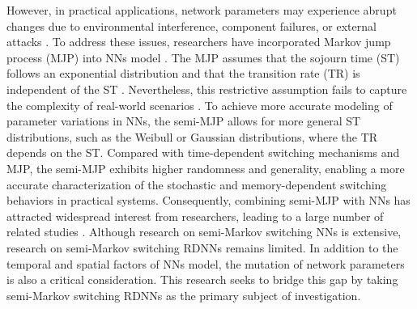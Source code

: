 \documentclass[preprint,review,fleqn,sort&compress,3p]{elsarticle}
\theoremstyle{definition}%
\begin{document}
	However, in practical applications, network parameters may experience abrupt changes due to environmental interference, component failures, or external attacks \cite{qi2025protocolbaseda}. To address these issues, researchers have incorporated Markov jump process (MJP) into NNs model . The MJP assumes that the sojourn time (ST) follows an exponential distribution and that the transition rate (TR) is independent of the ST \cite{liu2024preassignedtime}. Nevertheless, this restrictive assumption fails to capture the complexity of real-world scenarios \cite{wei2025timespacea,yao2024multisensorbaseda}. To achieve more accurate modeling of parameter variations in NNs, the semi-MJP allows for more general ST distributions, such as the Weibull or Gaussian distributions, where the TR depends on the ST. {\color{red}Compared with time-dependent switching mechanisms \cite{sang2021sampleddatabased} and MJP, the semi-MJP exhibits higher randomness and generality, enabling a more accurate characterization of the stochastic and memory-dependent switching behaviors in practical systems\cite{li2024hmmbased,li2024nonfragile}.} Consequently, combining semi-MJP with NNs has attracted widespread interest from researchers, leading to a large number of related studies \cite{wei2025probabilisticsamplingbaseda,liu2023new,xiong2023stochastic}. Although research on semi-Markov switching NNs is extensive, research on semi-Markov switching RDNNs remains limited. In addition to the temporal and spatial factors of NNs model, the mutation of network parameters is also a critical consideration. This research seeks to bridge this gap by taking semi-Markov switching RDNNs as the primary subject of investigation.
	
\end{document}
